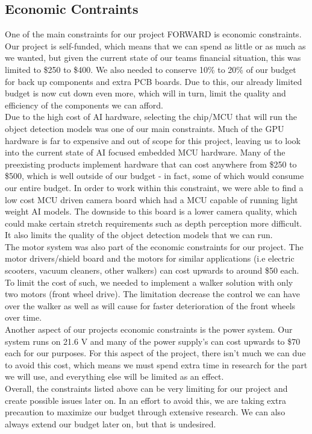 \subsection{Economic Contraints}
\noindent One of the main constraints for our project FORWARD is economic constraints. Our project is self-funded, which means that we can spend as little or as much as we wanted, but given the current state of our teams financial situation, this was limited to \$250 to \$400. We also needed to conserve 10\% to 20\% of our budget for back up components and extra PCB boards. Due to this, our already limited budget is now cut down even more, which will in turn, limit the quality and efficiency of the components we can afford. \\

\noindent Due to the high cost of AI hardware, selecting the chip/MCU that will run the object detection models was one of our main constraints. Much of the GPU hardware is far to expensive and out of scope for this project, leaving us to look into the current state of AI focused embedded MCU hardware. Many of the preexisting products implement hardware that can cost anywhere from \$250 to \$500, which is well outside of our budget - in fact, some of which would consume our entire budget. In order to work within this constraint, we were able to find a low cost MCU driven camera board which had a MCU capable of running light weight AI models. The downside to this board is a lower camera quality, which could make certain stretch requirements such as depth perception more difficult. It also limits the quality of the object detection models that we can run. \\

\noindent The motor system was also part of the economic constraints for our project. The motor drivers/shield board and the motors for similar applications (i.e electric scooters, vacuum cleaners, other walkers) can cost upwards to around \$50 each. To limit the cost of such, we needed to implement a walker solution with only two motors (front wheel drive). The limitation decrease the control we can have over the walker as well as will cause for faster deterioration of the front wheels over time. \\

\noindent Another aspect of our projects economic constraints is the power system. Our system runs on 21.6 V and many of the power supply's can cost upwards to \$70 each for our purposes. For this aspect of the project, there isn't much we can due to avoid this cost, which means we must spend extra time in research for the part we will use, and everything else will be limited as an effect. \\

\noindent Overall, the constraints listed above can be very limiting for our project and create possible issues later on. In an effort to avoid this, we are taking extra precaution to maximize our budget through extensive research. We can also always extend our budget later on, but that is undesired.